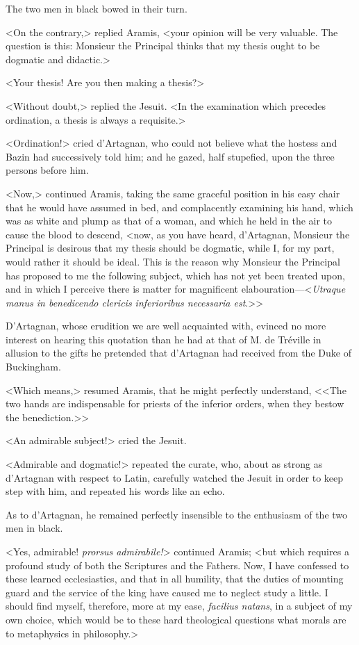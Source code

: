 The two men in black bowed in their turn. 

<On the contrary,> replied Aramis, <your opinion will be very valuable. The question is this: Monsieur the Principal thinks that my thesis ought to be dogmatic and didactic.> 

<Your thesis! Are you then making a thesis?> 

<Without doubt,> replied the Jesuit. <In the examination which precedes ordination, a thesis is always a requisite.> 

<Ordination!> cried d'Artagnan, who could not believe what the hostess and Bazin had successively told him; and he gazed, half stupefied, upon the three persons before him. 

<Now,> continued Aramis, taking the same graceful position in his easy chair that he would have assumed in bed, and complacently examining his hand, which was as white and plump as that of a woman, and which he held in the air to cause the blood to descend, <now, as you have heard, d'Artagnan, Monsieur the Principal is desirous that my thesis should be dogmatic, while I, for my part, would rather it should be ideal. This is the reason why Monsieur the Principal has proposed to me the following subject, which has not yet been treated upon, and in which I perceive there is matter for magnificent elabouration---<\textit{Utraque manus in benedicendo clericis inferioribus necessaria est}.>> 

D'Artagnan, whose erudition we are well acquainted with, evinced no more interest on hearing this quotation than he had at that of M. de Tréville in allusion to the gifts he pretended that d'Artagnan had received from the Duke of Buckingham. 

<Which means,> resumed Aramis, that he might perfectly understand, <<The two hands are indispensable for priests of the inferior orders, when they bestow the benediction.>> 

<An admirable subject!> cried the Jesuit. 

<Admirable and dogmatic!> repeated the curate, who, about as strong as d'Artagnan with respect to Latin, carefully watched the Jesuit in order to keep step with him, and repeated his words like an echo. 

As to d'Artagnan, he remained perfectly insensible to the enthusiasm of the two men in black. 

<Yes, admirable! \textit{prorsus admirabile!}> continued Aramis; <but which requires a profound study of both the Scriptures and the Fathers. Now, I have confessed to these learned ecclesiastics, and that in all humility, that the duties of mounting guard and the service of the king have caused me to neglect study a little. I should find myself, therefore, more at my ease, \textit{facilius natans}, in a subject of my own choice, which would be to these hard theological questions what morals are to metaphysics in philosophy.> 

